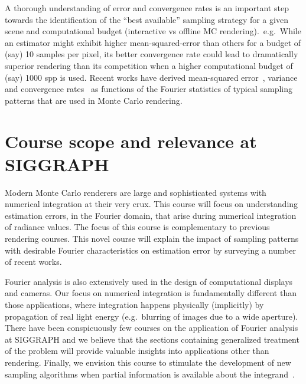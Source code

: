\documentclass{acmsiggraph}
\begin{document}
A thorough understanding of error and convergence rates is an important step towards the identification of the ``best available'' sampling strategy for a given scene and computational budget (interactive vs offline MC rendering).~e.g.~While an estimator might exhibit higher mean-squared-error than others for a budget of (say) 10 samples per pixel, its better convergence rate could lead to dramatically superior rendering than its competition when a higher computational budget of (say) 1000 spp is used.
Recent works have derived mean-squared error~\cite{durand2011frequency,Ramamoorthi:2012}, variance~\cite{Subr:2013:FAS,subr14error} and convergence rates~\cite{Pilleboue:2015:VAM} as functions of the Fourier statistics of typical sampling patterns that are used in Monte Carlo rendering. 

\section{Course scope and relevance at SIGGRAPH}
Modern Monte Carlo renderers are large and sophisticated systems with numerical integration at their very crux. This course will focus on understanding estimation errors, in the Fourier domain, that arise during numerical integration of radiance values. The focus of this course is complementary to previous rendering courses. This novel course will explain the impact of sampling patterns with desirable Fourier characteristics on estimation error by surveying a number of recent works.

Fourier analysis is also extensively used in the design of computational displays and cameras. Our focus on numerical integration is fundamentally different than those applications, where integration happens physically (implicitly) by propagation of real light energy  (e.g.~blurring of images due to a wide aperture). There have been conspicuously few courses on the application of Fourier analysis at SIGGRAPH and we believe that the sections containing generalized treatment of the problem will provide valuable insights into applications other than rendering. Finally, we envision this course to stimulate the development of new sampling algorithms when partial information is available about the integrand~\cite{Cov5D}.
\end{document}
